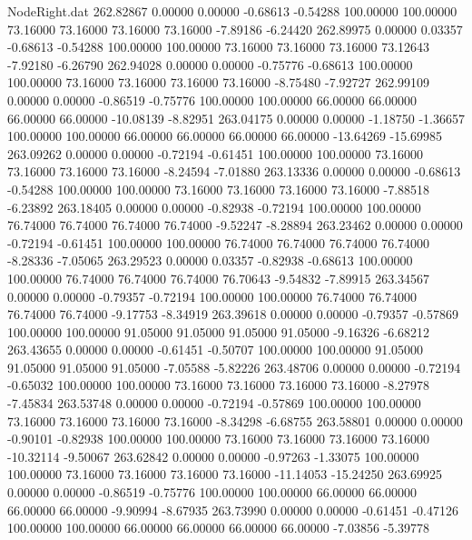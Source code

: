 \begin{filecontents}{NodeRight.dat}
 262.82867    0.00000    0.00000    -0.68613   -0.54288  100.00000  100.00000   73.16000   73.16000   73.16000   73.16000   -7.89186   -6.24420
 262.89975    0.00000    0.03357    -0.68613   -0.54288  100.00000  100.00000   73.16000   73.16000   73.16000   73.12643   -7.92180   -6.26790
 262.94028    0.00000    0.00000    -0.75776   -0.68613  100.00000  100.00000   73.16000   73.16000   73.16000   73.16000   -8.75480   -7.92727
 262.99109    0.00000    0.00000    -0.86519   -0.75776  100.00000  100.00000   66.00000   66.00000   66.00000   66.00000  -10.08139   -8.82951
 263.04175    0.00000    0.00000    -1.18750   -1.36657  100.00000  100.00000   66.00000   66.00000   66.00000   66.00000  -13.64269  -15.69985
 263.09262    0.00000    0.00000    -0.72194   -0.61451  100.00000  100.00000   73.16000   73.16000   73.16000   73.16000   -8.24594   -7.01880
 263.13336    0.00000    0.00000    -0.68613   -0.54288  100.00000  100.00000   73.16000   73.16000   73.16000   73.16000   -7.88518   -6.23892
 263.18405    0.00000    0.00000    -0.82938   -0.72194  100.00000  100.00000   76.74000   76.74000   76.74000   76.74000   -9.52247   -8.28894
 263.23462    0.00000    0.00000    -0.72194   -0.61451  100.00000  100.00000   76.74000   76.74000   76.74000   76.74000   -8.28336   -7.05065
 263.29523    0.00000    0.03357    -0.82938   -0.68613  100.00000  100.00000   76.74000   76.74000   76.74000   76.70643   -9.54832   -7.89915
 263.34567    0.00000    0.00000    -0.79357   -0.72194  100.00000  100.00000   76.74000   76.74000   76.74000   76.74000   -9.17753   -8.34919
 263.39618    0.00000    0.00000    -0.79357   -0.57869  100.00000  100.00000   91.05000   91.05000   91.05000   91.05000   -9.16326   -6.68212
 263.43655    0.00000    0.00000    -0.61451   -0.50707  100.00000  100.00000   91.05000   91.05000   91.05000   91.05000   -7.05588   -5.82226
 263.48706    0.00000    0.00000    -0.72194   -0.65032  100.00000  100.00000   73.16000   73.16000   73.16000   73.16000   -8.27978   -7.45834
 263.53748    0.00000    0.00000    -0.72194   -0.57869  100.00000  100.00000   73.16000   73.16000   73.16000   73.16000   -8.34298   -6.68755
 263.58801    0.00000    0.00000    -0.90101   -0.82938  100.00000  100.00000   73.16000   73.16000   73.16000   73.16000  -10.32114   -9.50067
 263.62842    0.00000    0.00000    -0.97263   -1.33075  100.00000  100.00000   73.16000   73.16000   73.16000   73.16000  -11.14053  -15.24250
 263.69925    0.00000    0.00000    -0.86519   -0.75776  100.00000  100.00000   66.00000   66.00000   66.00000   66.00000   -9.90994   -8.67935
 263.73990    0.00000    0.00000    -0.61451   -0.47126  100.00000  100.00000   66.00000   66.00000   66.00000   66.00000   -7.03856   -5.39778

\end{filecontents}

